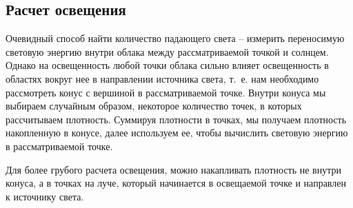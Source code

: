 \subsection{Расчет освещения}
Очевидный способ найти количество падающего света -- измерить переносимую световую энергию внутри облака между рассматриваемой точкой и солнцем. Однако на освещенность любой точки облака сильно влияет освещенность в областях вокруг нее в направлении источника света, т.~е. нам необходимо рассмотреть конус с вершиной в рассматриваемой точке. Внутри конуса мы выбираем случайным образом, некоторое количество точек, в которых рассчитываем плотность. Суммируя плотности в точках, мы получаем плотность накопленную в конусе, далее используем ее, чтобы вычислить световую энергию в рассматриваемой точке.

Для более грубого расчета освещения, можно накапливать плотность не внутри конуса, а в точках на луче, который начинается в освещаемой точке и направлен к источнику света. 


